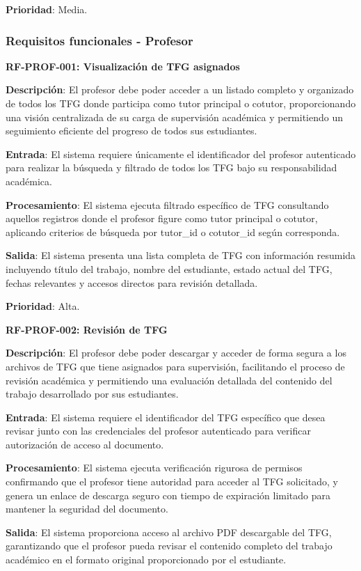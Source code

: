 \documentclass[12pt,a4paper,oneside]{report}
\begin{document}
\textbf{Prioridad}: Media.

\subsubsection{Requisitos funcionales -
Profesor}\label{requisitos-funcionales---profesor}

\textbf{RF-PROF-001: Visualización de TFG asignados}

\textbf{Descripción}: El profesor debe poder acceder a un listado completo y organizado de todos los TFG donde participa como tutor principal o cotutor, proporcionando una visión centralizada de su carga de supervisión académica y permitiendo un seguimiento eficiente del progreso de todos sus estudiantes.

\textbf{Entrada}: El sistema requiere únicamente el identificador del profesor autenticado para realizar la búsqueda y filtrado de todos los TFG bajo su responsabilidad académica.

\textbf{Procesamiento}: El sistema ejecuta filtrado específico de TFG consultando aquellos registros donde el profesor figure como tutor principal o cotutor, aplicando criterios de búsqueda por tutor_id o cotutor_id según corresponda.

\textbf{Salida}: El sistema presenta una lista completa de TFG con información resumida incluyendo título del trabajo, nombre del estudiante, estado actual del TFG, fechas relevantes y accesos directos para revisión detallada.

\textbf{Prioridad}: Alta.

\textbf{RF-PROF-002: Revisión de TFG}

\textbf{Descripción}: El profesor debe poder descargar y acceder de forma segura a los archivos de TFG que tiene asignados para supervisión, facilitando el proceso de revisión académica y permitiendo una evaluación detallada del contenido del trabajo desarrollado por sus estudiantes.

\textbf{Entrada}: El sistema requiere el identificador del TFG específico que desea revisar junto con las credenciales del profesor autenticado para verificar autorización de acceso al documento.

\textbf{Procesamiento}: El sistema ejecuta verificación rigurosa de permisos confirmando que el profesor tiene autoridad para acceder al TFG solicitado, y genera un enlace de descarga seguro con tiempo de expiración limitado para mantener la seguridad del documento.

\textbf{Salida}: El sistema proporciona acceso al archivo PDF descargable del TFG, garantizando que el profesor pueda revisar el contenido completo del trabajo académico en el formato original proporcionado por el estudiante.
\end{document}
